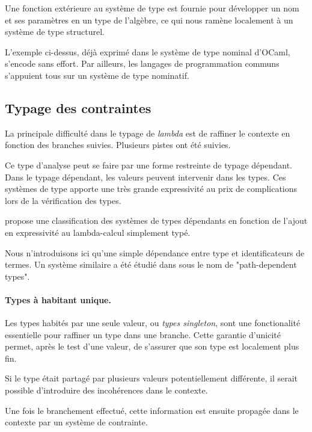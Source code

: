 Une fonction extérieure au système de type est fournie pour développer un nom et
ses paramètres en un type de l'algèbre, ce qui nous ramène localement à un
système de type structurel.

L'exemple ci-dessus, déjà exprimé dans le système de type nominal d'OCaml,
s'encode sans effort. Par ailleurs, les langages de programmation communs
s'appuient tous sur un système de type nominatif.

\subsection{Typage des contraintes}

La principale difficulté dans le typage de \emph{lambda} est de raffiner le
contexte en fonction des branches suivies.  Plusieurs pistes ont été suivies.

Ce type d'analyse peut se faire par une forme restreinte de typage dépendant.
Dans le typage dépendant, les valeurs peuvent intervenir dans les types. Ces
systèmes de type apporte une très grande expressivité au prix de complications
lors de la vérification des types. 

\cite{LambdaCube} propose une classification des systèmes de types dépendants en
fonction de l'ajout en expressivité au lambda-calcul simplement typé.

Nous n'introduisons ici qu'une simple dépendance entre type et identificateurs
de termes. Un système similaire a été étudié  dans \cite{Odersky02anominal} sous
le nom de "path-dependent types".

\paragraph{Types à habitant unique.}
Les types habités par une seule valeur, ou \emph{types singleton}, sont une
fonctionalité essentielle pour raffiner un type dans une branche.
Cette garantie d'unicité permet, après le test d'une valeur, de s'assurer que
son type est localement plus fin. 

Si le type était partagé par plusieurs valeurs potentiellement différente, il
serait possible d'introduire des incohérences dans le contexte.

Une fois le branchement effectué, cette information est ensuite propagée dans le
contexte par un système de contrainte.
